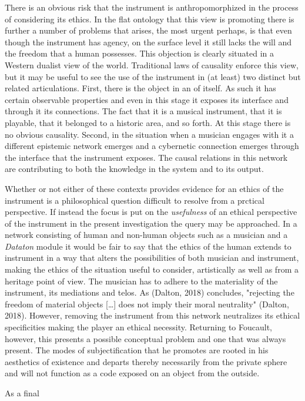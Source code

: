 \documentclass[11pt]{article}
\begin{document}
There is an obvious risk that the instrument is anthropomorphized in the process of considering its ethics. In the flat ontology that this view is promoting there is further a number of problems that arises, the most urgent perhaps, is that even though the instrument has agency, on the surface level it still lacks the will and the freedom that a human possesses. This objection is clearly situated in a Western dualist view of the world. Traditional laws of causality enforce this view, but it may be useful to see the use of the instrument in (at least) two distinct but related articulations. First, there is the object in an of itself. As such it has certain observable properties and even in this stage it exposes its interface and through it its connections. The fact that it is a musical instrument, that it is playable, that it belonged to a historic area, and so forth. At this stage there is no obvious causality. Second, in the situation when a musician engages with it a different epistemic network emerges and a cybernetic connection emerges through the interface that the instrument exposes. The causal relations in this network are contributing to both the knowledge in the system and to its output.

Whether or not either of these contexts provides evidence for an ethics of the instrument is a philosophical question difficult to resolve from a prctical perspective. If instead the focus is put on the \emph{usefulness} of an ethical perspective of the instrument in the present investigation the query may be approached. In a network consisting of human and non-human objects such as a musician and a \emph{Dataton} module it would be fair to say that the ethics of the human extends to instrument in a way that alters the possibilities of both musician and instrument, making the ethics of the situation useful to consider, artistically as well as from a heritage point of view. The musician has to adhere to the materiality of the instrument, its mediations and telos. As (Dalton, 2018) concludes, "rejecting the freedom of material objects [\ldots] does not imply their moral neutrality" (Dalton, 2018). However, removing the instrument from this network neutralizes its ethical specificities making the player an ethical necessity. Returning to Foucault, however, this presents a possible conceptual problem and one that was always present. The modes of subjectification that he promotes are rooted in his aesthetics of existence and departs thereby necessarily from the private sphere and will not function as a code exposed on an object from the outside.



As a final 
\end{document}
